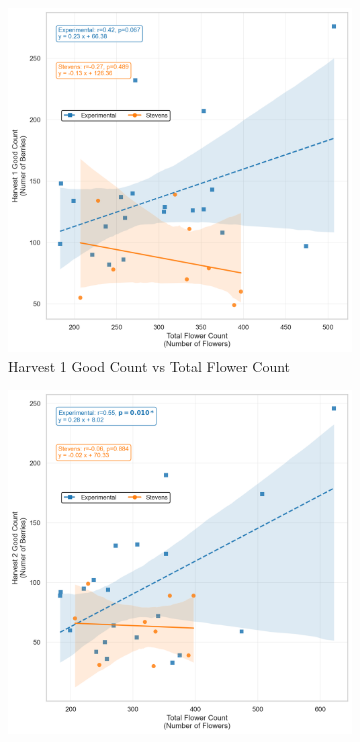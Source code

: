 \begin{figure}[!ht]
  \begin{subfigure}{0.45\textwidth}
    \includegraphics[width=\textwidth]{images/H1 GC vs TFC.png}
   \caption{Harvest 1 Good Count vs Total Flower Count}
    \label{fig:H1 GC vs TFC}
  \end{subfigure}
  \hfill
  \begin{subfigure}{0.45\textwidth}
    \includegraphics[width=\textwidth]{images/H2 GC vs TFC.png}

\end{subfigure}
\end{figure}
